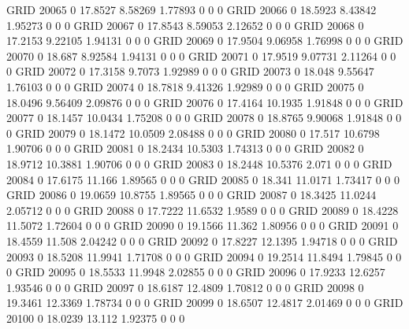 GRID    20065   0       17.8527 8.58269 1.77893 0       0       0       
GRID    20066   0       18.5923 8.43842 1.95273 0       0       0       
GRID    20067   0       17.8543 8.59053 2.12652 0       0       0       
GRID    20068   0       17.2153 9.22105 1.94131 0       0       0       
GRID    20069   0       17.9504 9.06958 1.76998 0       0       0       
GRID    20070   0       18.687  8.92584 1.94131 0       0       0       
GRID    20071   0       17.9519 9.07731 2.11264 0       0       0       
GRID    20072   0       17.3158 9.7073  1.92989 0       0       0       
GRID    20073   0       18.048  9.55647 1.76103 0       0       0       
GRID    20074   0       18.7818 9.41326 1.92989 0       0       0       
GRID    20075   0       18.0496 9.56409 2.09876 0       0       0       
GRID    20076   0       17.4164 10.1935 1.91848 0       0       0       
GRID    20077   0       18.1457 10.0434 1.75208 0       0       0       
GRID    20078   0       18.8765 9.90068 1.91848 0       0       0       
GRID    20079   0       18.1472 10.0509 2.08488 0       0       0       
GRID    20080   0       17.517  10.6798 1.90706 0       0       0       
GRID    20081   0       18.2434 10.5303 1.74313 0       0       0       
GRID    20082   0       18.9712 10.3881 1.90706 0       0       0       
GRID    20083   0       18.2448 10.5376 2.071   0       0       0       
GRID    20084   0       17.6175 11.166  1.89565 0       0       0       
GRID    20085   0       18.341  11.0171 1.73417 0       0       0       
GRID    20086   0       19.0659 10.8755 1.89565 0       0       0       
GRID    20087   0       18.3425 11.0244 2.05712 0       0       0       
GRID    20088   0       17.7222 11.6532 1.9589  0       0       0       
GRID    20089   0       18.4228 11.5072 1.72604 0       0       0       
GRID    20090   0       19.1566 11.362  1.80956 0       0       0       
GRID    20091   0       18.4559 11.508  2.04242 0       0       0       
GRID    20092   0       17.8227 12.1395 1.94718 0       0       0       
GRID    20093   0       18.5208 11.9941 1.71708 0       0       0       
GRID    20094   0       19.2514 11.8494 1.79845 0       0       0       
GRID    20095   0       18.5533 11.9948 2.02855 0       0       0       
GRID    20096   0       17.9233 12.6257 1.93546 0       0       0       
GRID    20097   0       18.6187 12.4809 1.70812 0       0       0       
GRID    20098   0       19.3461 12.3369 1.78734 0       0       0       
GRID    20099   0       18.6507 12.4817 2.01469 0       0       0       
GRID    20100   0       18.0239 13.112  1.92375 0       0       0       
